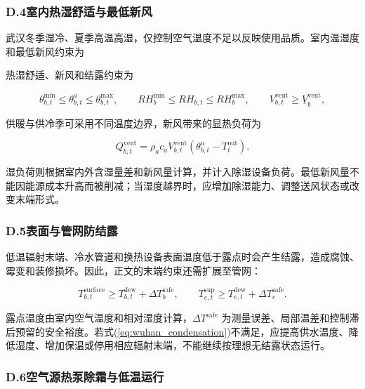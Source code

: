 \subsubsection*{D.4\quad 室内热湿舒适与最低新风}

武汉冬季湿冷、夏季高温高湿，仅控制空气温度不足以反映使用品质。室内温湿度和最低新风约束为

热湿舒适、新风和结露约束为

\begin{equation}
\theta_{b,t}^{\min}\leq\theta_{b,t}^{a}\leq\theta_{b,t}^{\max},
\qquad
RH_b^{\min}\leq RH_{b,t}\leq RH_b^{\max},
\qquad
V_{b,t}^{\mathrm{vent}}\geq\underline V_b^{\mathrm{vent}},
\label{eq:wuhan_comfort}
\end{equation}

供暖与供冷季可采用不同温度边界，新风带来的显热负荷为

\begin{equation}
Q_{b,t}^{\mathrm{vent}}
=\rho_ac_aV_{b,t}^{\mathrm{vent}}
\left(\theta_{b,t}^{a}-T_t^{\mathrm{out}}\right).
\label{eq:wuhan_ventilation}
\end{equation}

湿负荷则根据室内外含湿量差和新风量计算，并计入除湿设备负荷。最低新风量不能因能源成本升高而被削减；当湿度越界时，应增加除湿能力、调整送风状态或改变末端形式。

\subsubsection*{D.5\quad 表面与管网防结露}

低温辐射末端、冷水管道和换热设备表面温度低于露点时会产生结露，造成腐蚀、霉变和装修损坏。因此，正文的末端约束还需扩展至管网：

\begin{equation}
T_{b,t}^{\mathrm{surface}}\geq T_{b,t}^{\mathrm{dew}}+\Delta T_b^{\mathrm{safe}},
\qquad
T_{e,t}^{\mathrm{sup}}\geq T_{e,t}^{\mathrm{dew}}+\Delta T_e^{\mathrm{safe}}.
\label{eq:wuhan_condensation}
\end{equation}

露点温度由室内空气温度和相对湿度计算，$\Delta T^{\mathrm{safe}}$ 为测量误差、局部温差和控制滞后预留的安全裕度。若式(\ref{eq:wuhan_condensation})不满足，应提高供水温度、降低湿度、增加保温或停用相应辐射末端，不能继续按理想无结露状态运行。

\subsubsection*{D.6\quad 空气源热泵除霜与低温运行}


